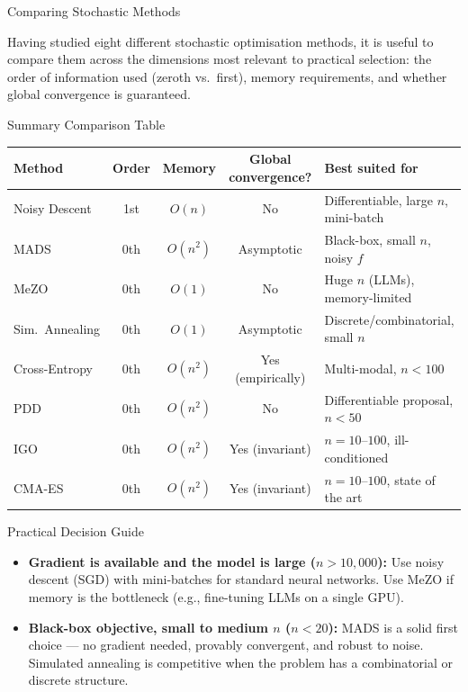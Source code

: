 \documentclass[aspectratio=169,10pt]{beamer}
\begin{document}
\begin{frame}[allowframebreaks]{Comparing Stochastic Methods}

Having studied eight different stochastic optimisation methods, it is useful to compare them across the dimensions most relevant to practical selection: the order of information used (zeroth vs.\ first), memory requirements, and whether global convergence is guaranteed.

\begin{block}{Summary Comparison Table}
\begin{center}
{\footnotesize
\begin{tabular}{lcccl}
\toprule
Method & Order & Memory & Global convergence? & Best suited for \\
\midrule
Noisy Descent  & 1st & $O(n)$   & No  & Differentiable, large $n$, mini-batch \\
MADS           & 0th & $O(n^2)$ & Asymptotic & Black-box, small $n$, noisy $f$ \\
MeZO           & 0th & $O(1)$   & No  & Huge $n$ (LLMs), memory-limited \\
Sim.\ Annealing & 0th & $O(1)$   & Asymptotic & Discrete/combinatorial, small $n$ \\
Cross-Entropy  & 0th & $O(n^2)$ & Yes (empirically) & Multi-modal, $n < 100$ \\
PDD            & 0th & $O(n^2)$ & No  & Differentiable proposal, $n < 50$ \\
IGO            & 0th & $O(n^2)$ & Yes (invariant) & $n = 10$--$100$, ill-conditioned \\
CMA-ES         & 0th & $O(n^2)$ & Yes (invariant) & $n = 10$--$100$, state of the art \\
\bottomrule
\end{tabular}
}
\end{center}
\end{block}

\begin{block}{Practical Decision Guide}
\begin{itemize}
  \item \textbf{Gradient is available and the model is large ($n > 10{,}000$):} Use noisy descent (SGD) with mini-batches for standard neural networks. Use MeZO if memory is the bottleneck (e.g., fine-tuning LLMs on a single GPU).

  \item \textbf{Black-box objective, small to medium $n$ ($n < 20$):} MADS is a solid first choice --- no gradient needed, provably convergent, and robust to noise. Simulated annealing is competitive when the problem has a combinatorial or discrete structure.


\end{itemize}
\end{block}
\end{frame}
\end{document}
